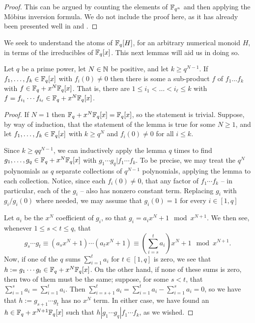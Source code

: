 \begin{proof}
	This can be argued by counting the elements of $\mathbb{F}_{q^n}$ and then applying the M\"{o}bius inversion formula.
	We do not include the proof here, as it has already been presented well in \cite[Section 14.3]{dummit-foote91} and \cite[Section 2.3]{lidl-niederreiter97}.
\end{proof}

We seek to understand the atoms of $\mathbb{F}_q[H]$, for an arbitrary numerical monoid $H$, in terms of the irreducibles of $\mathbb{F}_q[x]$.
This next lemmas will aid us in doing so.

\begin{lemma}\label{lem:coefficient gap boosting}
	Let $q$ be a prime power, let $N\in\mathbb{N}$ be positive, and let $k \ge q^{N-1}$.
	If $f_1,\dots,f_k\in \mathbb{F}_q[x]$ with $f_i(0)\neq 0$ then there is some a sub-product $f$ of $f_1\dots f_k$ with $f\in \mathbb{F}_q + x^N \mathbb{F}_q[x]$.
	That is, there are $1\le i_1 < \dots < i_\ell \le k$ with $f = f_{i_1}\cdots f_{i_\ell} \in \mathbb{F}_q + x^N \mathbb{F}_q[x]$.
\end{lemma}

\begin{proof}
	If $N=1$ then $\mathbb{F}_q + x^N\mathbb{F}_q[x] = \mathbb{F}_q[x]$, so the statement is trivial.
	Suppose, by way of induction, that the statement of the lemma is true for some $N\ge 1$, and let $f_1,\dots, f_k\in \mathbb{F}_q[x]$ with $k \ge q^N$ and $f_i(0)\neq0$ for all $i\le k$.
	
	Since $k \ge q q^{N-1}$, we can inductively apply the lemma $q$ times to find $g_1,\dots,g_q\in \mathbb{F}_q + x^N \mathbb{F}_q[x]$ with $g_1\cdots g_q | f_1\cdots f_k$.
	To be precise, we may treat the $q^N$ polynomials as $q$ separate collections of $q^{N-1}$ polynomials, applying the lemma to each collection.
	Notice, since each $f_i(0) \neq 0$, that any factor of $f_1\cdots f_k$ -- in particular, each of the $g_i$ -- also has nonzero constant term.
	Replacing $g_i$ with $g_i/g_i(0)$ where needed, we may assume that $g_i(0)=1$ for every $i\in [1,q]$
	
	Let $a_i$ be the $x^N$ coefficient of $g_i$, so that $g_i = a_i x^N + 1 \mod {x^{N+1}}$.
	We then see, whenever $1\le s<t\le q$, that
	\[ g_s\cdots g_t \equiv (a_s x^N + 1)\cdots(a_t x^N + 1) \equiv \left(\sum_{i=s}^t a_i\right) x^N + 1 \mod {x^{N+1}}. \]
	Now, if one of the $q$ sums $\sum_{i=1}^t a_i$ for $t\in [1,q]$ is zero, we see that $h := g_1\cdots g_t \in \mathbb{F}_q + x^N\mathbb{F}_q[x]$.
	On the other hand, if none of these sums is zero, then two of them must be the same; suppose, for some $s<t$, that $\sum_{i=1}^s a_i = \sum_{i=1}^t a_i$.
	Then $\sum_{i=s+1}^ta_i = \sum_{i=1}^t a_i - \sum_{i=1}^s a_i = 0$, so we have that $h := g_{s+1}\cdots g_t$ has no $x^N$ term.
	In either case, we have found an $h\in \mathbb{F}_q + x^{N+1}\mathbb{F}_q[x]$ such that $h | g_1\cdots g_q | f_1\cdots f_k$, as we wished.
\end{proof}

